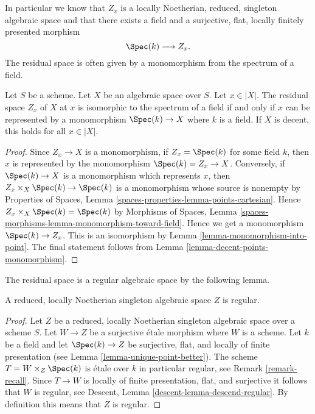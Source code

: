\noindent
In particular we know that $Z_x$ is a
locally Noetherian, reduced, singleton algebraic space
and that there exists a field and a surjective, flat, locally
finitely presented morphism
$$
\Spec(k) \longrightarrow Z_x.
$$
The residual space is often given by a monomorphism
from the spectrum of a field.

\begin{lemma}
\label{lemma-residual-space-monomorphism}
Let $S$ be a scheme. Let $X$ be an algebraic space over $S$. Let $x \in |X|$.
The residual space $Z_x$ of $X$ at $x$ is isomorphic to the spectrum of a field
if and only if $x$ can be represented by a monomorphism $\Spec(k) \to X$
where $k$ is a field. If $X$ is decent, this holds for all $x \in |X|$.
\end{lemma}

\begin{proof}
Since $Z_x \to X$ is a monomorphism, if $Z_x = \Spec(k)$ for some field $k$,
then $x$ is represented by the monomorphism $\Spec(k) = Z_x \to X$.
Conversely, if $\Spec(k) \to X$ is a monomorphism which represents $x$,
then $Z_x \times_X \Spec(k) \to \Spec(k)$ is a monomorphism whose source
is nonempty by Properties of Spaces, Lemma
\ref{spaces-properties-lemma-points-cartesian}.
Hence $Z_x \times_X \Spec(k) = \Spec(k)$ by Morphisms of Spaces, Lemma
\ref{spaces-morphisms-lemma-monomorphism-toward-field}.
Hence we get a monomorphism $\Spec(k) \to Z_x$. This is
an isomorphism by Lemma \ref{lemma-monomorphism-into-point}.
The final statement follows from Lemma \ref{lemma-decent-points-monomorphism}.
\end{proof}

\noindent
The residual space is a regular algebraic space by the following lemma.

\begin{lemma}
\label{lemma-residual-space-regular}
A reduced, locally Noetherian singleton algebraic space $Z$ is regular.
\end{lemma}

\begin{proof}
Let $Z$ be a reduced, locally Noetherian singleton algebraic space
over a scheme $S$. Let $W \to Z$ be a surjective \'etale morphism where $W$
is a scheme. Let $k$ be a field and let $\Spec(k) \to Z$
be surjective, flat, and locally of finite presentation (see
Lemma \ref{lemma-unique-point-better}).
The scheme $T = W \times_Z \Spec(k)$ is
\'etale over $k$ in particular regular, see
Remark \ref{remark-recall}.
Since $T \to W$ is locally of finite presentation, flat, and surjective it
follows that $W$ is regular, see
Descent, Lemma \ref{descent-lemma-descend-regular}.
By definition this means that $Z$ is regular.
\end{proof}

